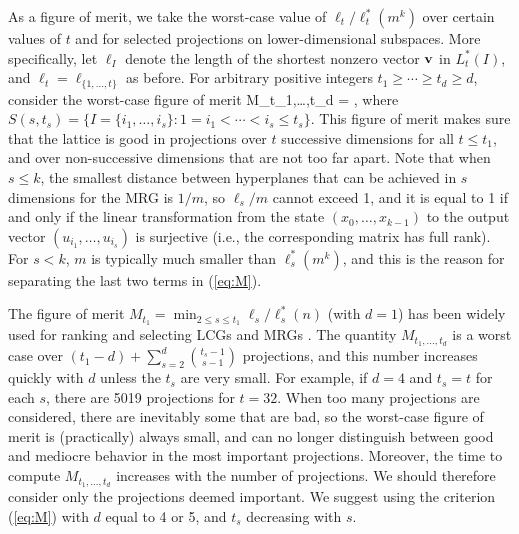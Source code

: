 
As a figure of merit, we take the worst-case value of $\ell_t/\ell_t^*(m^k)$
over certain values of $t$ and for selected projections on lower-dimensional
subspaces.  More specifically, let $\ell_I$ denote the length
of the shortest nonzero vector ${\bf v}$ in $L_t^*(I)$,
and $\ell_t = \ell_{\{1,\dots,t\}}$ as before.
For arbitrary positive integers $t_1\ge \cdots\ge t_d \ge d$,
consider the worst-case figure of merit
\eq
 M_{t_1,\dots,t_d} = \min{},
                                                            \label{eq:M}
\endeq
where $S(s,t_s) = \{I=\{i_1,\dots,i_s\} : 1 = i_1 < \cdots < i_s\le t_s\}$.
This figure of merit makes sure that the lattice is good in projections 
over $t$ successive dimensions for all $t\le t_1$, 
and over non-successive dimensions that are not too far apart.
Note that when $s\le k$, the smallest distance between hyperplanes that can
be achieved in $s$ dimensions for the MRG is $1/m$, so $\ell_s/m$ cannot
exceed 1, and it is equal to 1 if and only if the linear transformation
from the state $(x_0,\dots,x_{k-1})$ to the output vector 
$(u_{i_1},\dots,u_{i_s})$ is surjective (i.e., the corresponding matrix has
full rank).  For $s<k$, $m$ is typically much smaller than $\ell_s^*(m^k)$,
and this is the reason for separating the last two terms in (\ref{eq:M}).

The figure of merit $M_{t_1} = \min_{2\le s\le t_1} \ell_s/\ell_s^*(n)$
(with $d=1$) has been widely used for ranking and selecting
LCGs and MRGs \cite{sFIS96a,rLEC99b,rLEC99c}.
The quantity $M_{t_1,\dots,t_d}$ is a worst case over
$(t_1-d) + \sum_{s=2}^d {t_s-1\choose s-1}$ projections, and this
number increases quickly with $d$ unless the $t_s$ are very small.
For example, if $d=4$ and $t_s = t$ for each $s$,
there are 5019 projections for $t = 32$.
When too many projections are considered, there are inevitably some
that are bad, so the worst-case figure of merit is (practically)
always small, and can no longer distinguish
between good and mediocre behavior in the most important projections.
Moreover, the time to compute $M_{t_1,\dots,t_d}$ increases
with the number of projections.
We should therefore consider only the projections deemed important.
We suggest using the criterion (\ref{eq:M}) with $d$ equal to 4 or 5,
and $t_s$ decreasing with $s$.


